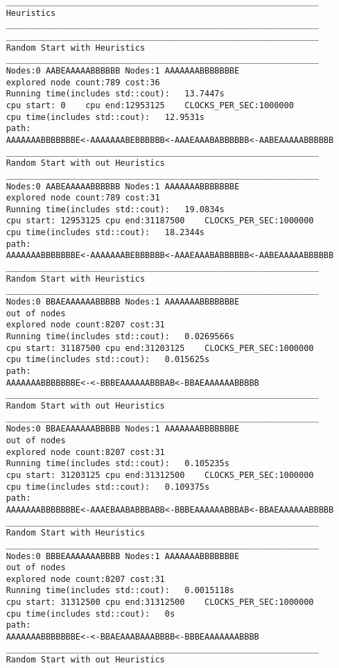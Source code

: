 \documentclass[12pt]{article}
\begin{document}
\begin{lstlisting}
	_______________________________________________________________
	Heuristics
	_______________________________________________________________
	_______________________________________________________________
	Random Start with Heuristics
	_______________________________________________________________
	Nodes:0	AABEAAAAABBBBBB Nodes:1	AAAAAAABBBBBBBE
	explored node count:789 cost:36
	Running time(includes std::cout):	13.7447s
	cpu start: 0	cpu end:12953125	CLOCKS_PER_SEC:1000000
	cpu time(includes std::cout):	12.9531s
	path:
	AAAAAAABBBBBBBE<-AAAAAAABEBBBBBB<-AAAEAAABABBBBBB<-AABEAAAAABBBBBB
	_______________________________________________________________
	Random Start with out Heuristics
	_______________________________________________________________
	Nodes:0	AABEAAAAABBBBBB Nodes:1	AAAAAAABBBBBBBE
	explored node count:789 cost:31
	Running time(includes std::cout):	19.0834s
	cpu start: 12953125	cpu end:31187500	CLOCKS_PER_SEC:1000000
	cpu time(includes std::cout):	18.2344s
	path:
	AAAAAAABBBBBBBE<-AAAAAAABEBBBBBB<-AAAEAAABABBBBBB<-AABEAAAAABBBBBB
	_______________________________________________________________
	Random Start with Heuristics
	_______________________________________________________________
	Nodes:0	BBAEAAAAAABBBBB Nodes:1	AAAAAAABBBBBBBE
	out of nodes
	explored node count:8207 cost:31
	Running time(includes std::cout):	0.0269566s
	cpu start: 31187500	cpu end:31203125	CLOCKS_PER_SEC:1000000
	cpu time(includes std::cout):	0.015625s
	path:
	AAAAAAABBBBBBBE<-<-BBBEAAAAAABBBAB<-BBAEAAAAAABBBBB
	_______________________________________________________________
	Random Start with out Heuristics
	_______________________________________________________________
	Nodes:0	BBAEAAAAAABBBBB Nodes:1	AAAAAAABBBBBBBE
	out of nodes
	explored node count:8207 cost:31
	Running time(includes std::cout):	0.105235s
	cpu start: 31203125	cpu end:31312500	CLOCKS_PER_SEC:1000000
	cpu time(includes std::cout):	0.109375s
	path:
	AAAAAAABBBBBBBE<-AAAEBAABABBBABB<-BBBEAAAAAABBBAB<-BBAEAAAAAABBBBB
	_______________________________________________________________
	Random Start with Heuristics
	_______________________________________________________________
	Nodes:0	BBBEAAAAAAABBBB Nodes:1	AAAAAAABBBBBBBE
	out of nodes
	explored node count:8207 cost:31
	Running time(includes std::cout):	0.0015118s
	cpu start: 31312500	cpu end:31312500	CLOCKS_PER_SEC:1000000
	cpu time(includes std::cout):	0s
	path:
	AAAAAAABBBBBBBE<-<-BBAEAAABAAABBBB<-BBBEAAAAAAABBBB
	_______________________________________________________________
	Random Start with out Heuristics

\end{lstlisting}
\end{document}

